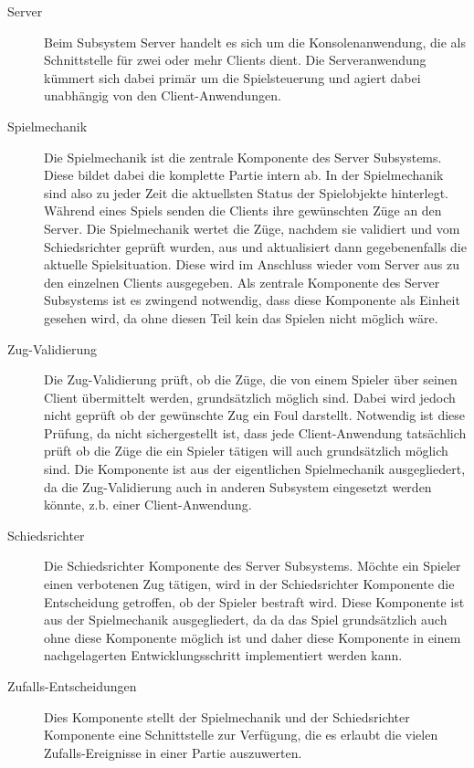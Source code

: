 		\begin{description}
			
			\item[Server]
			Beim Subsystem Server handelt es sich um die Konsolenanwendung, die als Schnittstelle für zwei oder mehr Clients dient. Die Serveranwendung kümmert sich dabei primär um die Spielsteuerung und agiert dabei unabhängig von den Client-Anwendungen.
			
			\item[Spielmechanik]
			Die Spielmechanik ist die zentrale Komponente des Server Subsystems. Diese bildet dabei die komplette Partie intern ab. In der Spielmechanik sind also zu jeder Zeit die aktuellsten Status der Spielobjekte hinterlegt. Während eines Spiels senden die Clients ihre gewünschten Züge an den Server. Die Spielmechanik wertet die Züge, nachdem sie validiert und vom Schiedsrichter geprüft wurden, aus und aktualisiert dann gegebenenfalls die aktuelle Spielsituation. Diese wird im Anschluss wieder vom Server aus zu den einzelnen Clients ausgegeben. Als zentrale Komponente des Server Subsystems ist es zwingend notwendig, dass diese Komponente als Einheit gesehen wird, da ohne diesen Teil kein das Spielen nicht möglich wäre.
			
			\item[Zug-Validierung]
			Die Zug-Validierung prüft, ob die Züge, die von einem Spieler über seinen Client übermittelt werden, grundsätzlich möglich sind. Dabei wird jedoch nicht geprüft ob der gewünschte Zug ein Foul darstellt. Notwendig ist diese Prüfung, da nicht sichergestellt ist, dass jede Client-Anwendung tatsächlich prüft ob die Züge die ein Spieler tätigen will auch grundsätzlich möglich sind. Die Komponente ist aus der eigentlichen Spielmechanik ausgegliedert, da die Zug-Validierung auch in anderen Subsystem eingesetzt werden könnte, z.b. einer Client-Anwendung.			
			
			\item[Schiedsrichter]
			Die Schiedsrichter Komponente des Server Subsystems. Möchte ein Spieler einen verbotenen Zug tätigen, wird in der Schiedsrichter Komponente die Entscheidung getroffen, ob der Spieler bestraft wird. Diese Komponente ist aus der Spielmechanik ausgegliedert, da da das Spiel grundsätzlich auch ohne diese Komponente möglich ist und daher diese Komponente in einem nachgelagerten Entwicklungsschritt implementiert werden kann.
			
			\item[Zufalls-Entscheidungen]
			Dies Komponente stellt der Spielmechanik und der Schiedsrichter Komponente eine Schnittstelle zur Verfügung, die es erlaubt die vielen Zufalls-Ereignisse in einer Partie auszuwerten.
			

\end{description}

